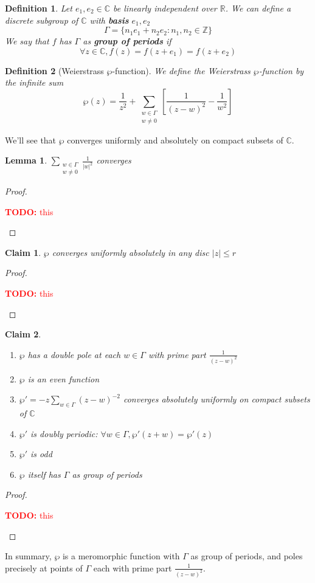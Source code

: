 \documentclass{article}
\newtheorem{lemma}{Lemma}
\newtheorem*{claim}{Claim}
\newcommand{\mbb}[1]{\mathbb{#1}}
\newtheorem{definition}{Definition}
\newcommand{\TODO}[1]{\begin{center}\huge{\textcolor{red}{\textbf{TODO:} #1}}\end{center}}
\begin{document}
\begin{definition}
Let \(e_1, e_2 \in \mbb{C}\) be linearly independent over \(\mbb{R}\). We can define a discrete subgroup of \(\mbb{C}\) with \textbf{basis} \(e_1, e_2\)
\begin{equation}\Gamma = \{n_1e_1 + n_2e_2 : n_1, n_2 \in \mbb{Z}\}\end{equation}
We say that \(f\) has \(\Gamma\) as \textbf{group of periods} if
\begin{equation}\forall z \in \mbb{C}, f(z) = f(z + e_1) = f(z + e_2)\end{equation}
\end{definition}
\begin{definition}[Weierstrass \(\wp\)-function]
We define the Weierstrass \(\wp\)-function by the infinite sum
\begin{equation}\wp(z) = \frac{1}{z^2} + \sum_{\substack{w \in \Gamma \\ w \neq 0}}\left[
  \frac{1}{(z - w)^2} - \frac{1}{w^2}
\right]\end{equation}
\end{definition}
We'll see that \(\wp\) converges uniformly and absolutely on compact subsets of \(\mbb{C}\).
\begin{lemma}
\(\sum_{\substack{w \in \Gamma \\ w \neq 0}}\frac{1}{|w|^2}\) converges
\end{lemma}
\begin{proof}
\TODO{this}
\end{proof}
\begin{claim}
\(\wp\) converges uniformly absolutely in any disc \(|z| \leq r\)
\end{claim}
\begin{proof}
\TODO{this}
\end{proof}
\begin{claim}
\begin{enumerate}
  \item \(\wp\) has a double pole at each \(w \in \Gamma\) with prime part \(\frac{1}{(z - w)^2}\)
  \item \(\wp\) is an even function
  \item \(\wp' = -z\sum_{w \in \Gamma}(z - w)^{-2}\) converges absolutely uniformly on compact subsets of \(\mbb{C}\)
  \item \(\wp'\) is doubly periodic: \(\forall w \in \Gamma, \wp'(z + w) = \wp'(z)\)
  \item \(\wp'\) is odd
  \item \(\wp\) itself has \(\Gamma\) as group of periods
\end{enumerate}
\end{claim}
\begin{proof}
\TODO{this}
\end{proof}
In summary, \(\wp\) is a meromorphic function with \(\Gamma\) as group of periods, and poles precisely at points of \(\Gamma\) each with prime part \(\frac{1}{(z - w)^2}\).
\end{document}

